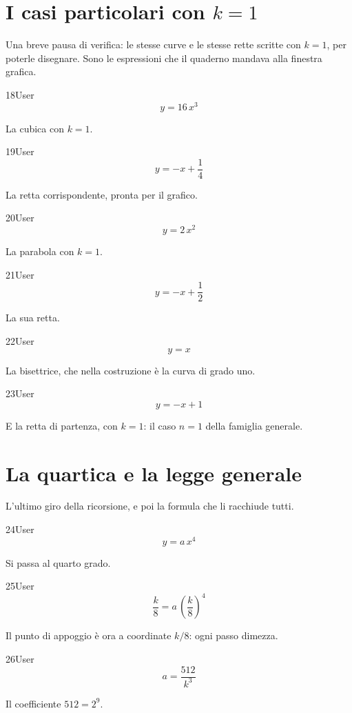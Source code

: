 \section{I casi particolari con $k=1$}

Una breve pausa di verifica: le stesse curve e le stesse rette scritte con $k=1$, per poterle disegnare. Sono le espressioni che il quaderno mandava alla finestra grafica.

\begin{espr}{18}{User}{}
\[
y = 16\, x^{3}
\]
\end{espr}
La cubica con $k=1$.

\begin{espr}{19}{User}{}
\[
y = -x + \frac{1}{4}
\]
\end{espr}
La retta corrispondente, pronta per il grafico.

\begin{espr}{20}{User}{}
\[
y = 2\, x^{2}
\]
\end{espr}
La parabola con $k=1$.

\begin{espr}{21}{User}{}
\[
y = -x + \frac{1}{2}
\]
\end{espr}
La sua retta.

\begin{espr}{22}{User}{}
\[
y = x
\]
\end{espr}
La bisettrice, che nella costruzione è la curva di grado uno.

\begin{espr}{23}{User}{}
\[
y = -x + 1
\]
\end{espr}
E la retta di partenza, con $k=1$: il caso $n=1$ della famiglia generale.

\section{La quartica e la legge generale}

L'ultimo giro della ricorsione, e poi la formula che li racchiude tutti.

\begin{espr}{24}{User}{}
\[
y = a\, x^{4}
\]
\end{espr}
Si passa al quarto grado.

\begin{espr}{25}{User}{}
\[
\frac{k}{8} = a\, \left(\frac{k}{8}\right)^{4}
\]
\end{espr}
Il punto di appoggio è ora a coordinate $k/8$: ogni passo dimezza.

\begin{espr}{26}{User}{}
\[
a = \frac{512}{k^{3}}
\]
\end{espr}
Il coefficiente $512=2^9$.

